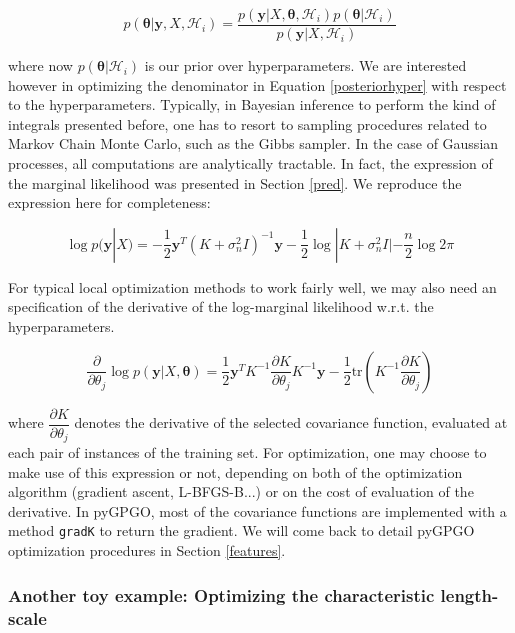 \documentclass[10pt,a4paper,twoside]{book}
\begin{document}
\begin{equation}
\label{posteriorhyper}
p(\boldsymbol{\theta}|\boldsymbol{y}, X, \mathcal{H}_i) = \dfrac{p(\boldsymbol{y}|X, \boldsymbol{\theta}, \mathcal{H}_i)p(\boldsymbol{\theta}|\mathcal{H}_i)}{p(\boldsymbol{y}|X, \mathcal{H}_i)}
\end{equation}

where now $p(\boldsymbol{\theta}|\mathcal{H}_i)$ is our prior over hyperparameters. We are interested however in optimizing the denominator in Equation \ref{posteriorhyper} with respect to the hyperparameters. Typically, in Bayesian inference to perform the kind of integrals presented before, one has to resort to sampling procedures related to Markov Chain Monte Carlo, such as the Gibbs sampler. In the case of Gaussian processes, all computations are analytically tractable. In fact, the expression of the marginal likelihood was presented in Section \ref{pred}. We reproduce the expression here for completeness:

\begin{equation}
\log p(\boldsymbol{y}|X) = - \dfrac{1}{2}\boldsymbol{y}^T(K + \sigma^2_n I)^{-1}\boldsymbol{y} - \dfrac{1}{2}\log |K + \sigma^2_n I| - \dfrac{n}{2}\log 2\pi
\end{equation}

For typical local optimization methods to work fairly well, we may also need an specification of the derivative of the log-marginal likelihood w.r.t. the hyperparameters.

\begin{equation}
\dfrac{\partial}{\partial \theta_j}\log p(\boldsymbol{y}|X, \boldsymbol{\theta}) = \dfrac{1}{2}\boldsymbol{y}^T K^{-1}\dfrac{\partial K}{\partial \theta_j}K^{-1}\boldsymbol{y} - \dfrac{1}{2}\textrm{tr}\left(K^{-1} \dfrac{\partial K}{\partial \theta_j} \right)
\end{equation}

where $\dfrac{\partial K}{\partial \theta_j}$ denotes the derivative of the selected covariance function, evaluated at each pair of instances of the training set. For optimization, one may choose to make use of this expression or not, depending on both of the optimization algorithm (gradient ascent, L-BFGS-B...) or on the cost of evaluation of the derivative. In pyGPGO, most of the covariance functions are implemented with a method \texttt{gradK} to return the gradient. We will come back to detail pyGPGO optimization procedures in Section \ref{features}. 

\subsubsection{Another toy example: Optimizing the characteristic length-scale}
\end{document}
